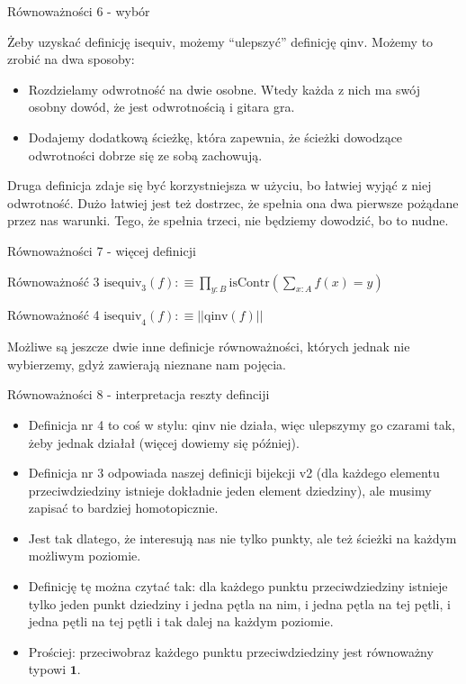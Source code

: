\documentclass{beamer}
\newcommand{\defn}{:\equiv}
\newcommand{\qinv}{\text{qinv}}
\newcommand{\isequiv}{\text{isequiv}}
\begin{document}
\begin{frame}{Równoważności 6 - wybór}

Żeby uzyskać definicję $\isequiv$, możemy ``ulepszyć'' definicję $\qinv$. Możemy to zrobić na dwa sposoby:

\begin{itemize}
	\item Rozdzielamy odwrotność na dwie osobne. Wtedy każda z nich ma swój osobny dowód, że jest odwrotnością i gitara gra.
	\item Dodajemy dodatkową ścieżkę, która zapewnia, że ścieżki dowodzące odwrotności dobrze się ze sobą zachowują.
\end{itemize}

Druga definicja zdaje się być korzystniejsza w użyciu, bo łatwiej wyjąć z niej odwrotność. Dużo łatwiej jest też dostrzec, że spełnia ona dwa pierwsze pożądane przez nas warunki. Tego, że spełnia trzeci, nie będziemy dowodzić, bo to nudne.

\end{frame}

\begin{frame}{Równoważności 7 - więcej definicji}

\begin{block}{Równoważność 3}
$
\displaystyle
	\isequiv_3(f) \defn
		\prod_{y : B} \text{isContr}\left(\sum_{x : A} f(x) = y\right)
$
\end{block}


\begin{block}{Równoważność 4}
$
\displaystyle
	\isequiv_4(f) \defn ||\qinv(f)||
$
\end{block}

Możliwe są jeszcze dwie inne definicje równoważności, których jednak nie wybierzemy, gdyż zawierają nieznane nam pojęcia.

\end{frame}

\begin{frame}{Równoważności 8 - interpretacja reszty definciji}
\begin{itemize}
	\item Definicja nr 4 to coś w stylu: $\qinv$ nie działa, więc ulepszymy go czarami tak, żeby jednak działał (więcej dowiemy się później).
	\item Definicja nr 3 odpowiada naszej definicji bijekcji v2 (dla każdego elementu przeciwdziedziny istnieje dokładnie jeden element dziedziny), ale musimy zapisać to bardziej homotopicznie.
	\item Jest tak dlatego, że interesują nas nie tylko punkty, ale też ścieżki na każdym możliwym poziomie.
	\item Definicję tę można czytać tak: dla każdego punktu przeciwdziedziny istnieje tylko jeden punkt dziedziny i jedna pętla na nim, i jedna pętla na tej pętli, i jedna pętli na tej pętli i tak dalej na każdym poziomie.
	\item Prościej: przeciwobraz każdego punktu przeciwdziedziny jest równoważny typowi $\textbf{1}$.
\end{itemize}
\end{frame}
\end{document}
